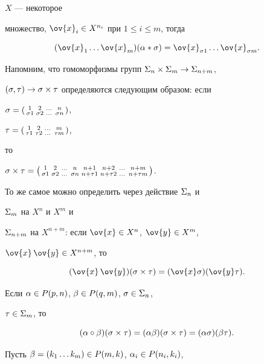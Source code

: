 $X $ --- некоторое


множество, $\ov{x}_i\in X^{n_i}$ при $1\leq i\leq m$, тогда


\begin{equation}


(\ov{x}_1\dotsc \ov{x}_m)(\al * \s)=\ov{x}_{\s 1}\dotsc\ov{x}_{\s m}.


\end{equation}


Напомним, что гомоморфизмы групп $\Sigma_n\times\Sigma_m\to\Sigma_{n+m}$,


$(\sigma,\tau)\to\sigma\times\tau$ определяются следующим образом: если


$\sigma=\left(\begin{smallmatrix}1 & 2 & \dotsc & n \\ \sigma 1 & \sigma 2 & \dotsc & \sigma n\end{smallmatrix}\right)$,


$\tau=\left(\begin{smallmatrix}1 & 2 & \dotsc & m \\ \tau 1 & \tau 2 & \dotsc & \tau m\end{smallmatrix}\right)$,


то


$\s\times\t=\mymat{


1 & 2 & \dotsc & n & n+1 & n+2 & \dotsc & n+m \\


\s 1 & \s 2 & \dotsc & \s n & n+\t 1 & n+\t 2 & \dotsc & n+\t m}$.


То же самое можно определить через действие $\Sigma_n$ и


$\Sigma_m$ на $X^n$ и $X^m$ и


$\Sigma_{n+m}$ на $X^{n+m}$: если $\ov{x}\in X^n$, $\ov{y}\in X^m$,


$\ov{x}\,\ov{y}\in X^{n+m}$, то


\begin{equation}


(\ov{x}\,\ov{y})(\s\times\t)=(\ov{x}\s)(\ov{y}\t).


\end{equation}





Если $\alpha\in P(p,n)$, $\beta\in P(q,m)$, $\sigma\in\Sigma_n$,


$\tau\in\Sigma_m$, то


\begin{equation}


(\al\circ \be)(\s\times\t)=(\al\be)(\s\times\t)=(\al\s)(\be\t).


\end{equation}


Пусть $\beta=(k_1\dotsc k_m)\in P(m,k)$, $\alpha_i\in P(n_i,k_i)$,


